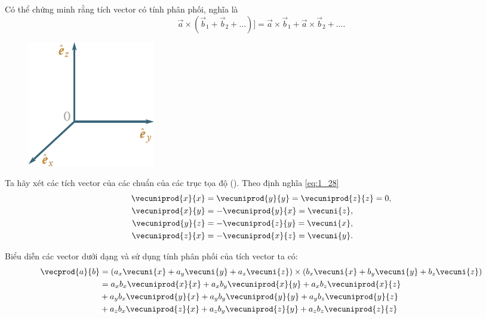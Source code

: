 \noindent
Có thể chứng minh rằng tích vector có tính phân phối, nghĩa là
\begin{equation}\label{eq:1_30}
\vec{a}\times(\vec{b}_1+\vec{b}_2+\ldots)] = \vec{a}\times\vec{b}_1 + \vec{a}\times\vec{b}_2 + \ldots.
\end{equation}

\begin{figure}[!htb]
	\begin{center}
		\includegraphics[scale=1]{figures/ch_01/fig_1_17.pdf}
		\caption[]{}
		\label{fig:1_17}
	\end{center}
\end{figure}

Ta hãy xét các tích vector của các chuẩn của các trục tọa độ (). Theo định nghĩa \eqref{eq:1_28}
\begin{align}
\vecuniprod{x}{x} &= \vecuniprod{y}{y} = \vecuniprod{z}{z} = 0,\nonumber\\
\vecuniprod{x}{y} &= -\vecuniprod{y}{x} = \vecuni{z},\label{eq:1_31}\\
\vecuniprod{y}{z} &= -\vecuniprod{z}{y} = \vecuni{x},\nonumber\\
\vecuniprod{z}{x} &= -\vecuniprod{x}{z} = \vecuni{y}.\nonumber
\end{align}

\noindent
Biểu diễn các vector dưới dạng  và sử dụng tính phân phối của tích vector ta có:
\begin{align*}
\vecprod{a}{b} &= (a_x\vecuni{x}+a_y\vecuni{y}+a_z\vecuni{z})\times(b_x\vecuni{x}+b_y\vecuni{y}+b_z\vecuni{z})\\
&= a_xb_x\vecuniprod{x}{x} + a_xb_y\vecuniprod{x}{y} + a_xb_z\vecuniprod{x}{z}\\
&+ a_yb_x\vecuniprod{y}{x} + a_yb_y\vecuniprod{y}{y} + a_yb_z\vecuniprod{y}{z}\\
&+ a_zb_x\vecuniprod{z}{x} + a_zb_y\vecuniprod{z}{y} + a_zb_z\vecuniprod{z}{z}
\end{align*}

